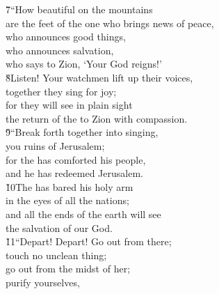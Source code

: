 \begin{poetry}
\poeml \v{7}``How beautiful on the mountains \\
\poemll    are the feet of the one who brings news of peace, \\
\poeml who announces good things, \\
\poemll    who announces salvation, \\
\poemlll       who says to Zion, `Your God reigns!' \\
\poeml \v{8}Listen! Your watchmen lift up their voices, \\
\poemll    together they sing for joy; \\
\poeml for they will see in plain sight \\
\poemll    the return of the  to Zion with compassion. \\
\poeml \v{9}``Break forth together into singing, \\
\poemll    you ruins of Jerusalem; \\
\poeml for the  has comforted his people, \\
\poemll    and he has redeemed Jerusalem. \\
\poeml \v{10}The  has bared his holy arm \\
\poemll    in the eyes of all the nations; \\
\poeml and all the ends of the earth will see \\
\poemll    the salvation of our God. \\
\poeml \v{11}``Depart! Depart! Go out from there; \\
\poemll    touch no unclean thing; \\
\poeml go out from the midst of her; \\
\poemll    purify yourselves, \\

\end{poetry}
